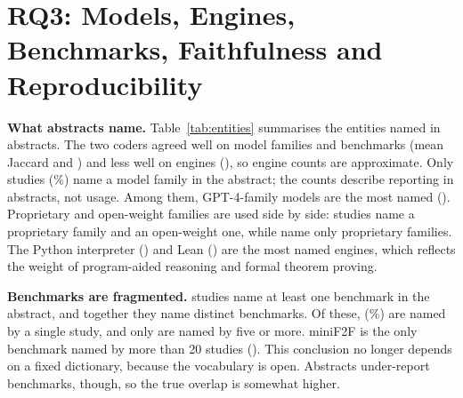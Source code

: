 \section{RQ3: Models, Engines, Benchmarks, Faithfulness and Reproducibility}
\label{sec:evaluation}

\begin{table}[t]
\centering
\caption{Language-model families, symbolic engines and benchmarks named in the abstracts of included studies (open-vocabulary extraction by two coders). Counts are unions---a study counts if either coder listed the entity---and are therefore upper bounds. The nine most named model families and engines are shown, and every benchmark named by five or more studies. ``Prover fine-tunes'' is a role, not a model family.}
\label{tab:entities}
\footnotesize

\end{table}

\textbf{What abstracts name.} Table~\ref{tab:entities} summarises the entities named in abstracts. The two coders agreed well on model families and benchmarks (mean Jaccard  and ) and less well on engines (), so engine counts are approximate. Only  studies (\%) name a model family in the abstract; the counts describe reporting in abstracts, not usage. Among them, GPT-4-family models are the most named (). Proprietary and open-weight families are used side by side:  studies name a proprietary family and  an open-weight one, while  name only proprietary families. The Python interpreter () and Lean () are the most named engines, which reflects the weight of program-aided reasoning and formal theorem proving.

\textbf{Benchmarks are fragmented.}  studies name at least one benchmark in the abstract, and together they name  distinct benchmarks. Of these,  (\%) are named by a single study, and only  are named by five or more. miniF2F is the only benchmark named by more than 20 studies (). This conclusion no longer depends on a fixed dictionary, because the vocabulary is open. Abstracts under-report benchmarks, though, so the true overlap is somewhat higher.



